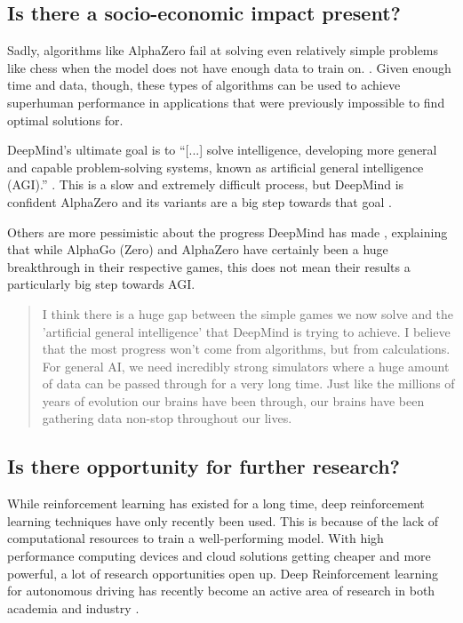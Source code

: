 \documentclass{article}
\begin{document}
\subsection{Is there a socio-economic impact present?}

Sadly, algorithms like AlphaZero fail at solving even relatively simple problems like chess when the model 
does not have enough data to train on.  \cite{ThomasMoerlandPostdoc}. 
Given enough time and data, though, these types of algorithms can be used to achieve superhuman
performance in applications that were previously impossible to find optimal solutions for.

DeepMind's ultimate goal is to ``[...] solve intelligence, developing more general and capable 
problem-solving systems, known as artificial general intelligence (AGI).'' \cite{DeepMind}.
This is a slow and extremely difficult process, but DeepMind is confident AlphaZero and 
its variants are a big step towards that goal \cite{AlphaZeroSheddingNew}.

Others are more pessimistic about the progress DeepMind has made \cite{moerlandEmailExchangeTuur22, dukezhouAnswerAlphaZeroExample2018},
explaining that while AlphaGo (Zero) and AlphaZero have certainly been a huge breakthrough in their respective games, 
this does not mean their results a particularly big step towards AGI. 

\begin{quotation}
    I think there is a huge gap between the simple games we now solve and the 
    'artificial general intelligence' that DeepMind is trying to achieve.
    I believe that the most progress won't come from algorithms, but from calculations.
    For general AI, we need incredibly strong simulators where a huge amount of data
    can be passed through for a very long time. 
    Just like the millions of years of evolution our brains have been through, our brains
    have been gathering data non-stop throughout our lives. \cite{moerlandEmailExchangeTuur22}
\end{quotation}


\subsection{Is there opportunity for further research?}

While reinforcement learning has existed for a long time, deep reinforcement learning techniques 
have only recently been used. This is because of the lack of computational resources to train
a well-performing model. With high performance computing devices and cloud solutions getting cheaper
and more powerful, a lot of research opportunities open up.
Deep Reinforcement learning for autonomous driving has recently become an active area of research 
in both academia and industry \cite{DeepReinforcementLearning2022a}.
\end{document}
